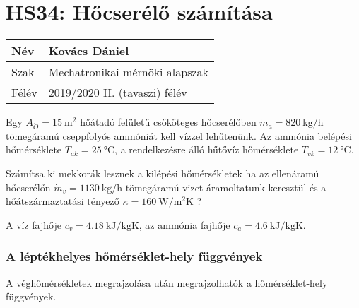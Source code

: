 \section*{HS34:  Hőcserélő számítása}


\begin{tabular}{ | p{2cm} | p{14cm} | } 
	\hline
	Név & Kovács Dániel \\ 
	\hline
	Szak &  Mechatronikai mérnöki alapszak\\
	\hline
	Félév & 2019/2020 II. (tavaszi) félév \\ 
	\hline
\end{tabular}
\vspace{0.5cm}

\noindent Egy $A_{\ddot{O}} = \SI{15}{\meter\squared}$ hőátadó felületű csőköteges hőcserélőben $\dot{m}_a = \SI{820}{\kilogram\per\hour}$ tömegáramú cseppfolyós ammóniát kell vízzel lehűtenünk. Az ammónia belépési hőmérséklete $T_{ak} = \SI{25}{\celsius}$, a rendelkezésre álló hűtővíz hőmérséklete $T_{vk} = \SI{12}{\celsius}$.

Számítsa ki mekkorák lesznek a kilépési hőmérsékletek ha az ellenáramú hőcserélőn $\dot{m}_v = \SI{1130}{\kilogram\per\hour}$ tömegáramú vizet áramoltatunk keresztül és a hőátszármaztatási tényező $\kappa = \SI{160}{\watt\per\meter\squared\kelvin}$ ?

A víz fajhője $c_v = \SI{4.18}{\kilo\joule\per\kilogram\kelvin}$, az ammónia fajhője $c_a = \SI{4.6}{\kilo\joule\per\kilogram\kelvin}$.



\subsubsection*{A léptékhelyes hőmérséklet-hely függvények}
A véghőmérsékletek megrajzolása után megrajzolhatók a hőmérséklet-hely függvények.

